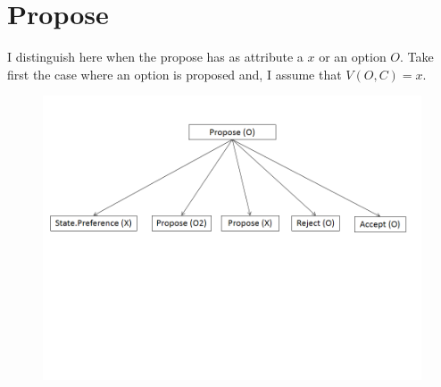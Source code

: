 \documentclass{llncs}
\begin{document}
\section{Propose}
I distinguish here when the propose has as attribute a $x$ or an option $O$. 
Take first the case where an option is proposed and, I assume that $V(O,C) = x$.

\begin{figure}
\centerline{\includegraphics[width=5in]{figs/proposeO.PNG}}

\end{figure}
\end{document}
